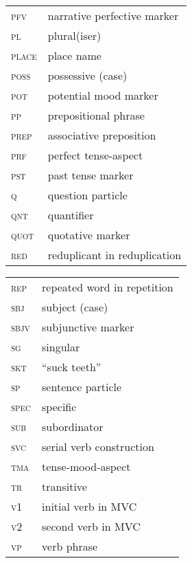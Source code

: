 \newpage 
\begin{tabularx}{.45\textwidth}{lQ}
\textsc{pfv} & narrative perfective marker\\
\textsc{pl} & plural(iser)\\
\textsc{place} & place name\\
\textsc{poss} & possessive (case)\\
\textsc{pot} & potential mood marker\\
\textsc{pp} & prepositional phrase\\
\textsc{prep} & associative preposition\\
\textsc{prf} & perfect tense-aspect\\
\textsc{pst} & past tense marker\\
\textsc{q} & question particle\\
\textsc{qnt} & quantifier\\
\textsc{quot} & quotative marker\\
\textsc{red} & reduplicant in reduplication\\
\end{tabularx}
\begin{tabularx}{.45\textwidth}{lQ}
\textsc{rep} & repeated word in repetition\\
\textsc{sbj} & subject (case)\\
\textsc{sbjv} & subjunctive marker\\
\textsc{sg} & singular\\
\textsc{skt} & “suck teeth”\\
\textsc{sp} & sentence particle\\
\textsc{spec} & specific\\
\textsc{sub} & subordinator\\
\textsc{svc} & serial verb construction\\
\textsc{tma} & tense-mood-aspect\\
\textsc{tr} & transitive\\
\textsc{v1} & initial verb in \textsc{MVC}\\
\textsc{v2} & second verb in \textsc{MVC}\\
\textsc{vp} & verb phrase\\
\end{tabularx}